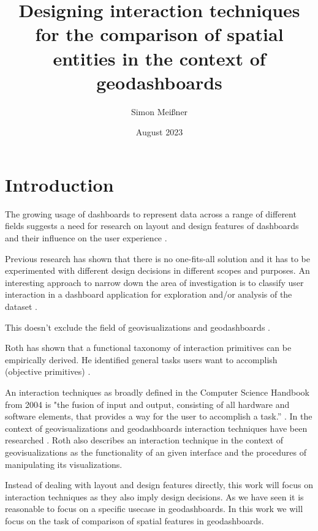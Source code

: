 \documentclass[12pt, twoside]{report}
\title{Designing interaction techniques for the comparison of spatial entities in the context of geodashboards}
\author{Simon Meißner}
\date{August 2023}
\begin{document}
\maketitle

\begin{abstract}
\end{abstract}

\tableofcontents



\chapter{Introduction}
The growing usage of dashboards to represent data across a range of different 
fields suggests a need for research on layout and design features of dashboards 
and their influence on the user experience \citep*{Yigitbasioglu.2012,Sarikaya.2018}.

Previous research has shown that there is no one-fits-all solution and it has to be
experimented with different design decisions in different scopes and purposes.
An interesting approach to narrow down the area of investigation is to classify 
user interaction in a dashboard application for exploration and/or analysis of the
dataset \citep{Wehrend.1990}.

This doesn't exclude the field of geovisualizations and geodashboards \citep*{Andrienko.2003}.

Roth has shown that a functional taxonomy of interaction primitives can be empirically derived. 
He identified general tasks users want to accomplish (objective primitives) \citep{Roth.2013}.

An interaction techniques as broadly defined in the Computer Science Handbook from 2004 is 
"the fusion of input and output, consisting of all hardware and software elements, that provides 
a way for the user to accomplish a task.” \citep*{Hinckley.2004}. In the context of 
geovisualizations and geodashboards interaction techniques have been researched 
\citep*{Keim.2005,Lobo.2015,Roth.2013,vanTonder.2011}.
Roth also describes an interaction technique in the context of geovisualizations as the
functionality of an given interface and the procedures of manipulating its visualizations.

Instead of dealing with layout and design features directly, this work will focus on interaction techniques
as they also imply design decisions. As we have seen it is reasonable to focus on a specific
usecase in geodashboards. In this work we will focus on the task of comparison of spatial features
in geodashboards.
\end{document}
